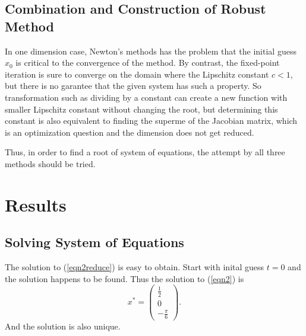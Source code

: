 \begin{table}[H]
\subsection{Combination and Construction of Robust Method}
In one dimension case, Newton's methods has the problem that the initial guess \(x_0\) is critical to the convergence of the method.
By contrast, the fixed-point iteration is sure to converge on the domain where the Lipschitz constant \(c<1\), but there is no garantee that the given system has such a property.
So transformation such as dividing by a constant can create a new function with smaller Lipschitz constant without changing the root, but determining this constant is also equivalent to finding the superme of the Jacobian matrix, which is an optimization question and the dimension does not get reduced.

Thus, in order to find a root of system of equations, the attempt by all three methods should be tried.




\section{Results}

\subsection{Solving System of Equations}
The solution to (\ref{eqn2reduce}) is easy to obtain.
Start with inital guess \(t=0\) and the solution happens to be found.
Thus the solution to (\ref{eqn2}) is
\[ x^*=\begin{pmatrix} \frac{1}{2} \\ 0 \\ -\frac{\pi}{6} \end{pmatrix}. \]
And the solution is also unique.





\end{table}
